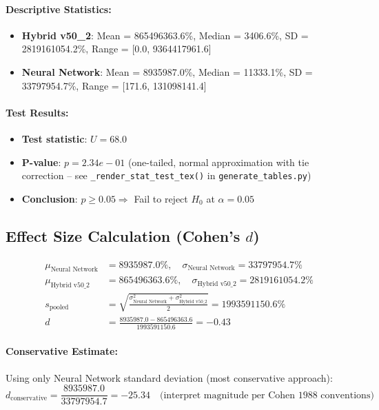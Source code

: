 \paragraph{Descriptive Statistics:}
\begin{itemize}
\item \textbf{Hybrid v50\_2}: Mean = 865496363.6\%, Median = 3406.6\%, SD = 2819161054.2\%, Range = [0.0, 9364417961.6]
\item \textbf{Neural Network}: Mean = 8935987.0\%, Median = 11333.1\%, SD = 33797954.7\%, Range = [171.6, 131098141.4]
\end{itemize}

\paragraph{Test Results:}
\begin{itemize}
\item \textbf{Test statistic}: $U = 68.0$
\item \textbf{P-value}: $p = 2.34e-01$ (one-tailed, normal approximation with tie correction -- see \texttt{\_render\_stat\_test\_tex()} in \texttt{generate\_tables.py})
\item \textbf{Conclusion}: $p \geq 0.05 \Rightarrow$ Fail to reject $H_0$ at $\alpha = 0.05$
\end{itemize}

\subsection{Effect Size Calculation (Cohen's $d$)}

\begin{align}
\mu_{\text{Neural Network}} &= 8935987.0\%, \quad \sigma_{\text{Neural Network}} = 33797954.7\% \\
\mu_{\text{Hybrid v50\_2}} &= 865496363.6\%, \quad \sigma_{\text{Hybrid v50\_2}} = 2819161054.2\% \\
s_{\text{pooled}} &= \sqrt{\frac{\sigma_{\text{Neural Network}}^2 + \sigma_{\text{Hybrid v50\_2}}^2}{2}} = 1993591150.6\% \\
d &= \frac{8935987.0 - 865496363.6}{1993591150.6} = -0.43
\end{align}

\paragraph{Conservative Estimate:}
Using only Neural Network standard deviation (most conservative approach):
\begin{equation}
d_{\text{conservative}} = \frac{8935987.0}{33797954.7} = -25.34 \quad \text{(interpret magnitude per Cohen 1988 conventions)}
\end{equation}

